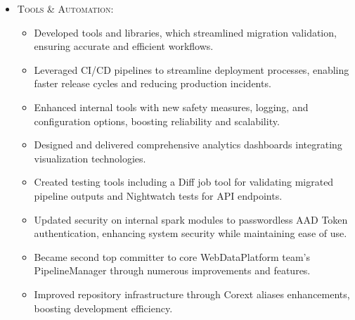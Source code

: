 \begin{itemize}
\begin{itemize}
        \item \scriptsize{\textsc{Tools \& Automation:}}
        \begin{itemize}
            \item \scriptsize{Developed tools and libraries, which streamlined migration validation, ensuring accurate and efficient workflows.}
            \item \scriptsize{Leveraged CI/CD pipelines to streamline deployment processes, enabling faster release cycles and reducing production incidents.}
            \item \scriptsize{Enhanced internal tools with new safety measures, logging, and configuration options, boosting reliability and scalability.}
            \item \scriptsize{Designed and delivered comprehensive analytics dashboards integrating visualization technologies.}
            \item \scriptsize{Created testing tools including a Diff job tool for validating migrated pipeline outputs and Nightwatch tests for API endpoints.}
            \item \scriptsize{Updated security on internal spark modules to passwordless AAD Token authentication, enhancing system security while maintaining ease of use.}
            \item \scriptsize{Became second top committer to core WebDataPlatform team's PipelineManager through numerous improvements and features.}
            \item \scriptsize{Improved repository infrastructure through Corext aliases enhancements, boosting development efficiency.}
        \end{itemize}


\end{itemize}
\end{itemize}
